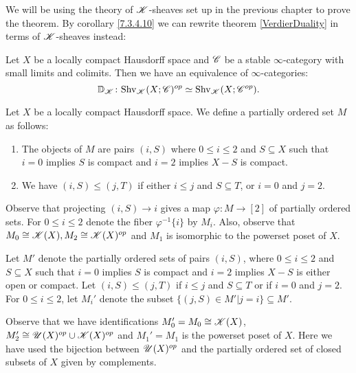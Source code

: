 \documentclass[../../thesis.tex]{subfiles}
\begin{document}
We will be using the theory of $\mathscr{K}$-sheaves set up in the previous chapter to prove the theorem.
By corollary \ref{7.3.4.10} we can rewrite theorem \ref{VerdierDuality} in terms of $\mathscr{K}$-sheaves instead:
\begin{theorem}\label{KVerdierDuality}
    Let $X$ be a locally compact Hausdorff space and $\mathscr{C}$ be a stable $\infty$-category with small limits and colimits.
    Then we have an equivalence of $\infty$-categories:
    \[
        \mathbb{D}_{\mathscr{K}} \colon \mathrm{Shv}_{\mathscr{K}}(X;\mathscr{C})^{op} \simeq \mathrm{Shv}_{\mathscr{K}}(X;\mathscr{C}^{op}).
    \]
\end{theorem}
\begin{definition}[{\cite[Notation 5.5.5.5]{HA}}]\label{5.5.5.5}
    Let $X$ be a locally compact Hausdorff space.
    We define a partially ordered set $M$ as follows:
    \begin{enumerate}
        \item The objects of $M$ are pairs $(i,S)$ where $0 \leq i \leq 2$ and $S \subseteq X$ such that $i=0$ implies $S$ is compact and $i=2$ implies $X-S$ is compact.
        \item We have $(i,S) \leq (j,T)$ if either $i\leq j$ and $S\subseteq T$, or $i=0$ and $j=2$.
    \end{enumerate}
\end{definition}
\begin{remark}[{\cite[Remark 5.5.5.6]{HA}}]
    Observe that projecting $(i,S) \to i$ gives a map $\varphi: M \to [2]$ of partially ordered sets.
    For $0 \leq i \leq 2$ denote the fiber $\varphi^{-1}\{i\}$ by $M_i$.
    Also, observe that $M_0 \cong \mathscr{K}(X), M_2\cong \mathscr{K}(X)^{op}$ and $M_1$ is isomorphic to the powerset poset of $X$.
\end{remark}
\begin{definition}
    Let $M'$ denote the partially ordered sets of pairs $(i,S)$, where $0 \leq i \leq 2$ and $S \subseteq X$ such that $i=0$ implies $S$ is compact and $i=2$ implies $X-S$ is either open or compact.
    Let $(i, S) \leq (j,T)$ if $i\leq j$ and $S\subseteq T$ or if $i=0$ and $j=2$.
    For $0 \leq i \leq 2$, let $M_i'$ denote the subset $\{(j,S) \in M' | j=i\} \subseteq M'$.
\end{definition}
\begin{remark}
    Observe that we have identifications $M_0'=M_0\cong \mathscr{K}(X)$, $M_2' \cong \mathscr{U}(X)^{op} \cup \mathscr{K}(X)^{op}$ and $M_1'=M_1$ is the powerset poset of $X$.
    Here we have used the bijection between $\mathscr{U}(X)^{op}$ and the partially ordered set of closed subsets of $X$ given by complements.
\end{remark}
\end{document}
